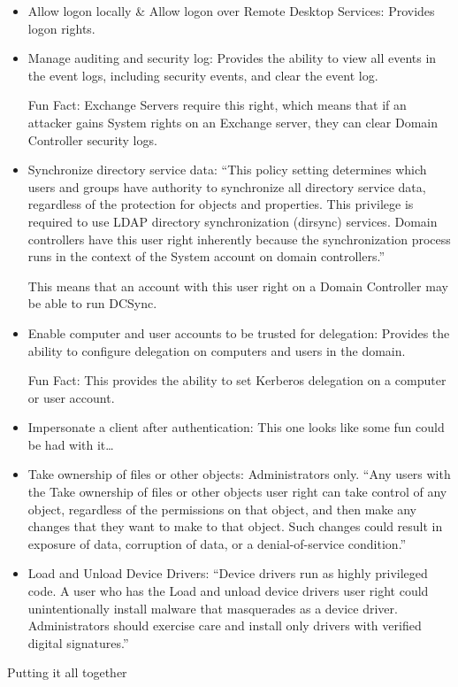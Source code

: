 \begin{itemize}
    \item Allow logon locally \& Allow logon over Remote Desktop Services: Provides logon rights.
    \item Manage auditing and security log: Provides the ability to view all events in the event logs, including security events, and clear the event log.

Fun Fact: Exchange Servers require this right, which means that if an attacker gains System rights on an Exchange server, they can clear Domain Controller security logs.
    \item Synchronize directory service data: “This policy setting determines which users and groups have authority to synchronize all directory service data, regardless of the protection for objects and properties. This privilege is required to use LDAP directory synchronization (dirsync) services. Domain controllers have this user right inherently because the synchronization process runs in the context of the System account on domain controllers.”

This means that an account with this user right on a Domain Controller may be able to run DCSync.
    \item Enable computer and user accounts to be trusted for delegation: Provides the ability to configure delegation on computers and users in the domain.

Fun Fact: This provides the ability to set Kerberos delegation on a computer or user account.
    \item Impersonate a client after authentication: This one looks like some fun could be had with it…
    \item Take ownership of files or other objects: Administrators only. “Any users with the Take ownership of files or other objects user right can take control of any object, regardless of the permissions on that object, and then make any changes that they want to make to that object. Such changes could result in exposure of data, corruption of data, or a denial-of-service condition.”
    \item Load and Unload Device Drivers: “Device drivers run as highly privileged code. A user who has the Load and unload device drivers user right could unintentionally install malware that masquerades as a device driver. Administrators should exercise care and install only drivers with verified digital signatures.”
\end{itemize}
Putting it all together

